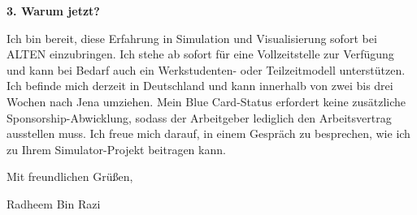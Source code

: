\documentclass[11pt,a4paper]{coverletter}
\begin{document}
\vspace{8pt}\noindent\textbf{3. Warum jetzt?}\par\vspace{3pt}

Ich bin bereit, diese Erfahrung in Simulation und Visualisierung sofort bei ALTEN einzubringen. Ich stehe ab sofort für eine Vollzeitstelle zur Verfügung und kann bei Bedarf auch ein Werkstudenten- oder Teilzeitmodell unterstützen. Ich befinde mich derzeit in Deutschland und kann innerhalb von zwei bis drei Wochen nach Jena umziehen. Mein Blue Card-Status erfordert keine zusätzliche Sponsorship-Abwicklung, sodass der Arbeitgeber lediglich den Arbeitsvertrag ausstellen muss. Ich freue mich darauf, in einem Gespräch zu besprechen, wie ich zu Ihrem Simulator-Projekt beitragen kann.

\closing{Mit freundlichen Grüßen,}{Radheem Bin Razi}
\end{document}
